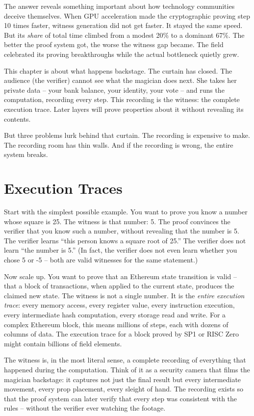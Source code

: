 \documentclass[
  11pt,
  openany]{report}
\begin{document}
The answer reveals something important about how technology communities deceive
themselves. When GPU acceleration made the cryptographic proving step 10 times
faster, witness generation did not get faster. It stayed the same speed. But its
\emph{share} of total time climbed from a modest 20\% to a dominant 67\%. The
better the proof system got, the worse the witness gap became. The field
celebrated its proving breakthroughs while the actual bottleneck quietly grew.

This chapter is about what happens backstage. The curtain has closed. The
audience (the verifier) cannot see what the magician does next. She takes her
private data -- your bank balance, your identity, your vote -- and runs the
computation, recording every step. This recording is the witness: the complete
execution trace. Later layers will prove properties about it without revealing
its contents.

But three problems lurk behind that curtain. The recording is expensive to make.
The recording room has thin walls. And if the recording is wrong, the entire
system breaks.

\section{Execution Traces}\label{execution-traces}

Start with the simplest possible example. You want to prove you know a number
whose square is 25. The witness is that number: 5. The proof convinces the
verifier that you know such a number, without revealing that the number is 5.
The verifier learns ``this person knows a square root of 25.'' The verifier does
not learn ``the number is 5.'' (In fact, the verifier does not even learn
whether you chose 5 or -5 -- both are valid witnesses for the same statement.)

Now scale up. You want to prove that an Ethereum state transition is valid --
that a block of transactions, when applied to the current state, produces the
claimed new state. The witness is not a single number. It is the \emph{entire
execution trace}: every memory access, every register value, every instruction
execution, every intermediate hash computation, every storage read and write.
For a complex Ethereum block, this means millions of steps, each with dozens of
columns of data. The execution trace for a block proved by SP1 or RISC Zero
might contain billions of field elements.

The witness is, in the most literal sense, a complete recording of everything
that happened during the computation. Think of it as a security camera that
films the magician backstage: it captures not just the final result but every
intermediate movement, every prop placement, every sleight of hand. The
recording exists so that the proof system can later verify that every step was
consistent with the rules -- without the verifier ever watching the footage.
\end{document}
